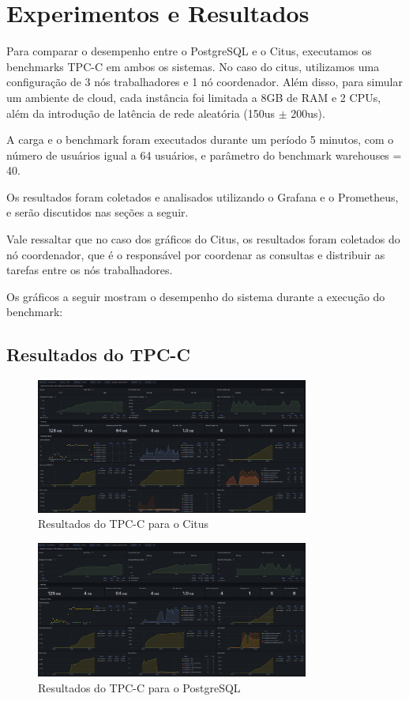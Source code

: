 \section{Experimentos e Resultados}

Para comparar o desempenho entre o PostgreSQL e o Citus, executamos os benchmarks TPC-C em ambos os sistemas.
No caso do citus, utilizamos uma configuração de 3 nós trabalhadores e 1 nó coordenador. Além disso, para simular um ambiente de cloud, cada instância foi limitada a 8GB de RAM e 2 CPUs,
além da introdução de latência de rede aleatória (150us $\pm$ 200us). 

A carga e o benchmark foram executados durante um período 5 minutos, 
com o número de usuários igual a 64 usuários, e parâmetro do benchmark warehouses = 40.

Os resultados foram coletados e analisados utilizando o Grafana e o Prometheus,
e serão discutidos nas seções a seguir.

Vale ressaltar que no caso dos gráficos do Citus, os resultados foram coletados do nó coordenador,
que é o responsável por coordenar as consultas e distribuir as tarefas entre os nós trabalhadores. 

Os gráficos a seguir mostram o desempenho do sistema durante a execução do benchmark:
\subsection{Resultados do TPC-C}
\begin{figure}[H]
	\centering
	\includegraphics[width=0.8\textwidth]{imgs/citus.jpg}
	\caption{Resultados do TPC-C para o Citus}
	\label{fig:tpc-c}
\end{figure}

\begin{figure}[H]
	\centering
	\includegraphics[width=0.8\textwidth]{imgs/Postgres.jpg}
	\caption{Resultados do TPC-C para o PostgreSQL}
	\label{fig:tpc-c}
\end{figure}

